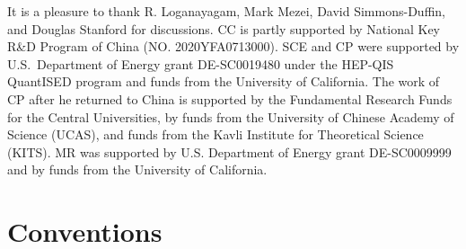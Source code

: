 \documentclass[11pt]{article}
\begin{document}
 

\acknowledgments
It is a pleasure to thank R. Loganayagam, Mark Mezei,  David Simmons-Duffin, and  Douglas Stanford for discussions.
CC is partly supported by National Key R\&D Program of China (NO. 2020YFA0713000).
SCE and CP were  supported by U.S.\ Department of Energy grant {DE-SC0019480} under the HEP-QIS QuantISED program and funds from the University of California. The work of CP after he returned to China is supported by the Fundamental Research Funds for the Central Universities, by funds from the University of Chinese Academy of Science (UCAS), and funds from the Kavli Institute for Theoretical Science (KITS). MR  was supported by  U.S. Department of Energy grant DE-SC0009999 and by funds from the University of California.  


\appendix
\section{Conventions} 
\label{sec:conventions}
\end{document}

